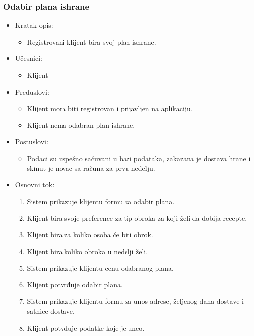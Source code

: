 \subsubsection{Odabir plana ishrane}

\begin{itemize}
    \item Kratak opis:
        \begin{itemize}
            \item Registrovani klijent bira svoj plan ishrane.
        \end{itemize}
    \item Učesnici:
        \begin{itemize}
            \item Klijent
        \end{itemize}
    \item Preduslovi:
        \begin{itemize}
            \item Klijent mora biti registrovan i prijavljen na aplikaciju.
            \item Klijent nema odabran plan ishrane.
        \end{itemize}
    \item Postuslovi:
        \begin{itemize}
            \item Podaci su uspešno sačuvani u bazi podataka, zakazana je dostava hrane i skinut je novac sa računa za prvu nedelju.
        \end{itemize}
    \item Osnovni tok:
        \begin{enumerate}
            \item Sistem prikazuje klijentu formu za odabir plana.
            \item Klijent bira svoje preference za tip obroka za koji želi da dobija recepte.
            \item Klijent bira za koliko osoba će biti obrok.
            \item Klijent bira koliko obroka u nedelji želi.
            \item Sistem prikazuje klijentu cenu odabranog plana.
            \item Klijent potvrđuje odabir plana.
            \item Sistem prikazuje klijentu formu za unos adrese, željenog dana dostave i satnice dostave.
            \item Klijent potvđuje podatke koje je uneo.

\end{enumerate}
\end{itemize}
